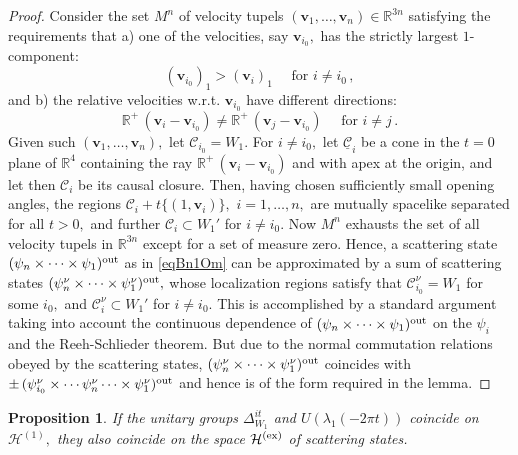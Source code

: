 \documentclass[a4paper,reqno,11pt]{amsart}
\theoremstyle{plain}
\newtheorem{Prop}[Thm]{Proposition}
\theoremstyle{definition}
\numberwithin{equation}{section}
\newcommand{\Bb}{\mathbb{R}}
\newcommand{\calH}{{\mathcal H}}
\newcommand{\calC}{{\mathcal C}}
\newcommand{\He}{\calH^{(1)}}
\newcommand{\bfv}{{\boldsymbol{v}}}
\newcommand{\ex}{{\rm ex} }
\newcommand{\DWR}{\Delta_{W_1}}  %
\newcommand{\cone}{\calC}   %
\begin{document}
\begin{proof}
Consider the set $M^n$ of velocity tupels $(\bfv_1,\dots,\bfv_n)\in\Bb^{3n}$
satisfying the requirements that  a) one of the velocities, 
say $\bfv_{i_0},$ has the strictly largest 
$1$-component: 
\[ (\bfv_{i_0})_1 > (\bfv_{i})_1  \quad\text{ for } i\neq i_0\,,\]
and b) the relative velocities w.r.t. $\bfv_{i_0}$ have different directions: 
\[ \Bb^+\,(\bfv_i-\bfv_{i_0}) \neq \Bb^+\,(\bfv_j-\bfv_{i_0}) 
\quad\text{ for } i\neq j \,.\]
Given such $(\bfv_1,\ldots,\bfv_n),$ let $\cone_{i_0}= W_1.$ For $i\neq
i_0,$ let $\underline{\cone}_i$ be a cone  in the $t=0$ plane of $\Bb^4$ 
containing the ray $\Bb^+\,(\bfv_i-\bfv_{i_0})$ and with 
apex at the origin, and let then $\cone_i$ be its causal closure. 
Then, having chosen sufficiently small
opening angles, the regions $\cone_i+t\{(1,\bfv_i)\},$ $i=1,\ldots,n,$ are  
mutually spacelike separated for all $t>0,$ and
further $\cone_i\subset W_1'$ for $i\neq i_0.$  
Now $M^n$ exhausts the set of all velocity tupels in $\Bb^{3n}$ except
for a set of measure
zero. Hence, a scattering state $(\psi_n\times\cdots\times\psi_1)^{{\rm out}}$ 
as in \eqref{eqBn1Om} can be approximated by a sum of scattering states
$(\psi^\nu_n\times\cdots\times\psi^\nu_1)^{{\rm out}},$ whose localization 
regions satisfy that $\cone^\nu_{i_0}= W_1$ for some $i_0,$ and 
$\cone^\nu_i\subset W_1'$ for $i\neq i_0.$ This is accomplished by a standard 
argument~\cite{Araki} taking into account the continuous dependence of 
$(\psi_n\times\cdots\times\psi_1)^{{\rm out}}$ on the $\psi_i$ and the 
Reeh-Schlieder theorem. 
But due to the normal commutation relations obeyed by the scattering
states, %
$(\psi^\nu_n\times\cdots\times\psi^\nu_1)^{{\rm out}}$ coincides with $\pm\,
(\psi^\nu_{i_0}\times\cdots\psi^\nu_n\cdots\times\psi^\nu_1)^{{\rm out}}$ 
and hence is of the form required in the lemma. 
\end{proof}
\begin{Prop} \label{ModCovScat}
 If the unitary groups $\DWR^{it}$ and $U(\lambda_1(-2\pi t))$
 coincide on $\He,$ they also coincide on the space $\calH^{(\ex)}$ of
 scattering states. 
\end{Prop}
\end{document}
